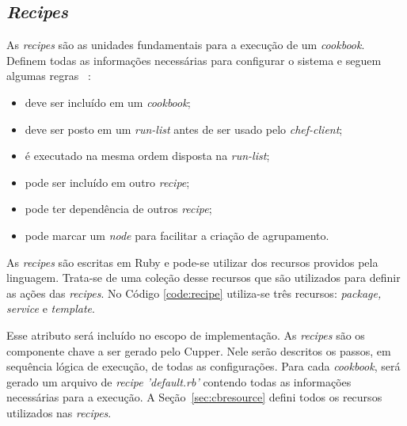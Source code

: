 
\subsection{\textit{Recipes}}
\label{sec:lev-rec}

As \textit{recipes} são as unidades fundamentais para a execução de um \textit{cookbook}. Definem
todas as informações necessárias para configurar o sistema e seguem algumas regras
~\cite{chefdoc:2016}:

\begin{itemize}
  \item deve ser incluído em um \textit{cookbook};
  \item deve ser posto em um \textit{run-list} antes de ser usado pelo \textit{chef-client};
  \item é executado na mesma ordem disposta na \textit{run-list};
  \item pode ser incluído em outro \textit{recipe};
  \item pode ter dependência de outros \textit{recipe};
  \item pode marcar um \textit{node} para facilitar a criação de agrupamento.
\end{itemize}

As \textit{recipes} são escritas em Ruby e pode-se utilizar dos recursos providos
pela linguagem. Trata-se de uma coleção desse recursos que são utilizados
para definir as ações das \textit{recipes}. No Código \ref{code:recipe} utiliza-se
três recursos: \textit{package, service} e \textit{template}.

\begin{minipage}{.90\textwidth}
  \lstset{style=shell}
  
\end{minipage}

Esse atributo será incluído no escopo de implementação. As \textit{recipes} são os componente chave a
ser gerado pelo Cupper. Nele serão descritos os passos, em sequência lógica de execução,
de todas as configurações. Para cada \textit{cookbook}, será gerado um arquivo de 
\textit{recipe 'default.rb'} contendo todas as informações necessárias para a execução.
A Seção~\ref{sec:cbresource} defini todos os recursos utilizados nas \textit{recipes}.
